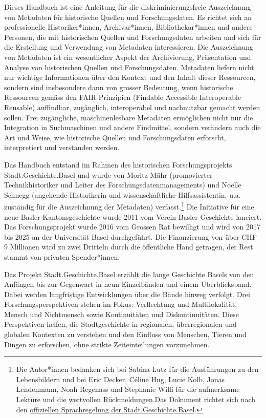 \documentclass[
  letterpaper,
  DIV=11,
  numbers=noendperiod,
  landscape,
  a4paper,
  geometry:margin=1in]{scrartcl}
\begin{document}
Dieses Handbuch ist eine Anleitung für die diskriminierungsfreie
Auszeichnung von Metadaten für historische Quellen und Forschungsdaten.
Es richtet sich an professionelle Historiker*innen, Archivar*innen,
Bibliothekar*innen und andere Personen, die mit historischen Quellen und
Forschungsdaten arbeiten und sich für die Erstellung und Verwendung von
Metadaten interessieren. Die Auszeichnung von Metadaten ist ein
wesentlicher Aspekt der Archivierung, Präsentation und Analyse von
historischen Quellen und Forschungsdaten. Metadaten liefern nicht nur
wichtige Informationen über den Kontext und den Inhalt dieser
Ressourcen, sondern sind insbesondere dann von grosser Bedeutung, wenn
historische Ressourcen gemäss den FAIR-Prinzipien (Findable Accessible
Interoperable Reusable) auffindbar, zugänglich, interoperabel und
nachnutzbar gemacht werden sollen. Frei zugängliche, maschinenlesbare
Metadaten ermöglichen nicht nur die Integration in Suchmaschinen und
andere Findmittel, sondern verändern auch die Art und Weise, wie
historische Quellen und Forschungsdaten erforscht, interpretiert und
verstanden werden.

Das Handbuch entstand im Rahmen des historischen Forschungsprojekts
Stadt.Geschichte.Basel und wurde von Moritz Mähr (promovierter
Technikhistoriker und Leiter des Forschungsdatenmanagements) und Noëlle
Schnegg (angehende Historikerin und wissenschaftliche Hilfsassistentin,
u.a. zuständig für die Auszeichnung der Metadaten) verfasst.\footnote{Die
  Autor*innen bedanken sich bei Sabina Lutz für die Ausführungen zu den
  Lebensbildern und bei Eric Decker, Céline Hug, Lucie Kolb, Jonas
  Lendenmann, Noah Regenass und Stephanie Willi für die aufmerksame
  Lektüre und die wertvollen Rückmeldungen.Das Dokument richtet sich
  nach den
  \href{https://stadtgeschichtebasel.ch/sprachregelung-der-stadt-geschichte-basel}{offiziellen
  Sprachregelung der Stadt.Geschichte.Basel}.} Die Initiative für eine
neue Basler Kantonsgeschichte wurde 2011 vom Verein Basler Geschichte
lanciert. Das Forschungsprojekt wurde 2016 vom Grossen Rat bewilligt und
wird von 2017 bis 2025 an der Universität Basel durchgeführt. Die
Finanzierung von über CHF 9 Millionen wird zu zwei Dritteln durch die
öffentliche Hand getragen, der Rest stammt von privaten Spender*innen.

Das Projekt Stadt.Geschichte.Basel erzählt die lange Geschichte Basels
von den Anfängen bis zur Gegenwart in neun Einzelbänden und einem
Überblicksband. Dabei werden langfristige Entwicklungen über die Bände
hinweg verfolgt. Drei Forschungsperspektiven stehen im Fokus:
Verflechtung und Multilokalität, Mensch und Nichtmensch sowie
Kontinuitäten und Diskontinuitäten. Diese Perspektiven helfen, die
Stadtgeschichte in regionalen, überregionalen und globalen Kontexten zu
verstehen und den Einfluss von Menschen, Tieren und Dingen zu
erforschen, ohne strikte Zeiteinteilungen vorzunehmen.
\end{document}
